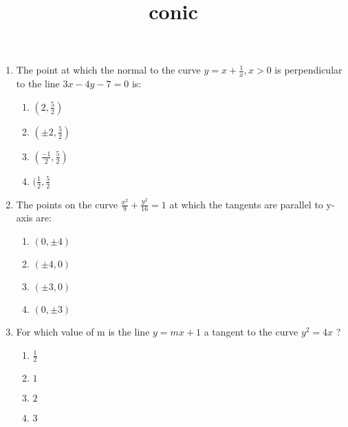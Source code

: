 \documentclass{article}
\title{conic}
\begin{document}
\begin{enumerate}
\item The point at which the normal to the curve $y = x+ \frac{1}{x}, x>0$ is perpendicular to the line $3x-4y-7=0$ is:
\begin{enumerate}[label=(\alph*)]
\item $(2,\frac{5}{2})$
\item $(\pm{2},\frac{5}{2})$
\item $(\frac{-1}{2},\frac{5}{2})$
\item $(\frac{1}{2},\frac{5}{2}$
\end{enumerate}
\item The points on the curve $\frac{x^2}{9} + \frac{y^2}{16} = 1$ at which the tangents are parallel to y-axis are:
	\begin{enumerate}[label=(\alph*)]
		\item $(0,\pm{4})$
		\item $(\pm{4},0)$
		\item $(\pm{3},0)$
		\item $(0,\pm{3})$
	\end{enumerate}
\item For which value of m is the line $y = mx +1$ a tangent to the curve $y^2= 4x$ ?
	\begin{enumerate}[label=(\alph*)]
		\item $\frac{1}{2}$
		\item $1$
		\item $2$
		\item $3$
	\end{enumerate}
\end{enumerate}
\end{document}
